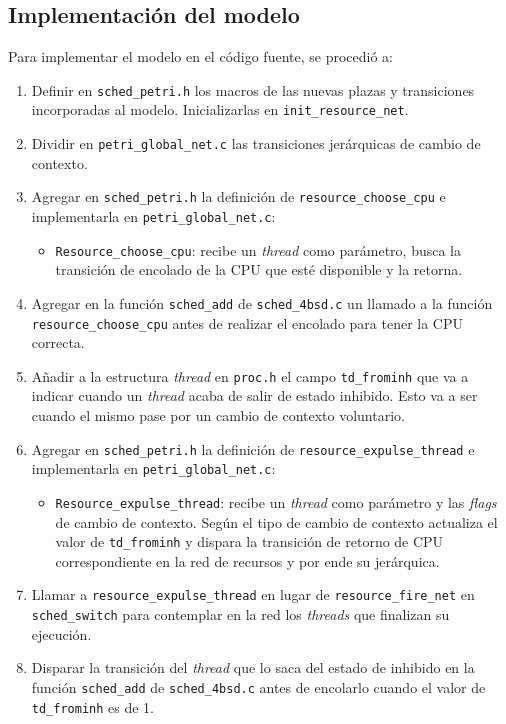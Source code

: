 \documentclass[a4paper]{book}
\begin{document}
\subsection{Implementaci\'on del modelo}
Para implementar el modelo en el c\'odigo fuente, se procedi\'o a:
\begin{enumerate}
\item Definir en \verb|sched_petri.h| los macros de las nuevas plazas y transiciones incorporadas al modelo. Inicializarlas en \verb|init_resource_net|.
\item Dividir en \verb|petri_global_net.c| las transiciones jer\'arquicas de cambio de contexto.
\item Agregar en \verb|sched_petri.h| la definici\'on de \verb|resource_choose_cpu| e implementarla en \verb|petri_global_net.c|:
\begin{itemize}
\item \verb|Resource_choose_cpu|: recibe un \emph{thread} como par\'ametro, busca la transici\'on de encolado de la CPU que est\'e disponible y la retorna.
\end{itemize}
\item Agregar en la funci\'on \verb|sched_add| de \verb|sched_4bsd.c| un llamado a la funci\'on \verb|resource_choose_cpu| antes de realizar el encolado para tener la CPU correcta.
\item A\~nadir a la estructura \emph{thread} en \verb|proc.h| el campo \verb|td_frominh| que va a indicar cuando un \emph{thread} acaba de salir de estado inhibido. Esto va a ser cuando el mismo pase por un cambio de contexto voluntario.
\item Agregar en \verb|sched_petri.h| la definici\'on de \verb|resource_expulse_thread| e implementarla en \verb|petri_global_net.c|:
\begin{itemize}
\item \verb|Resource_expulse_thread|: recibe un \emph{thread} como par\'ametro y las \emph{flags} de cambio de contexto. Seg\'un el tipo de cambio de contexto actualiza el valor de \verb|td_frominh| y dispara la transici\'on de retorno de CPU correspondiente en la red de recursos y por ende su jer\'arquica.
\end{itemize}
\item Llamar a \verb|resource_expulse_thread| en lugar de \verb|resource_fire_net| en \verb|sched_switch| para contemplar en la red los \emph{threads} que finalizan su ejecuci\'on.
\item Disparar la transici\'on del \emph{thread} que lo saca del estado de inhibido en la funci\'on \verb|sched_add| de \verb|sched_4bsd.c| antes de encolarlo cuando el valor de \verb|td_frominh| es de 1.
\end{enumerate}
\end{document}
